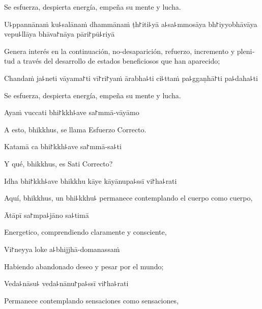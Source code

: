 \begin{english}
	Se esfuerza, despierta energía, empeña su mente y lucha.
\end{english}

\ifaivedition
\clearpage
\fi

U꜕ppannānaṁ ku꜕salānaṁ dhammānaṁ ṭh꜓iti꜕yā a꜕sa꜕mmosāya bh꜓iyyobhāvāya vepu꜕llāya bhāva꜓nāya pāri꜓pū꜕riyā

\begin{english}
	Genera interés en la continuación, no-desaparición, refuerzo, incremento y plenitud a través del desarrollo de estados beneficiosos que han aparecido;
\end{english}

Chandaṁ ja꜕neti vāyama꜓ti vī꜓ri꜓yaṁ ārabha꜕ti ci꜕ttaṁ pa꜕ggaṇhā꜓ti pa꜕daha꜕ti

\begin{english}
	Se esfuerza, despierta energía, empeña su mente y lucha.
\end{english}

Ayaṁ vuccati bhi꜓kkh꜕ave sa꜓mmā-vāyāmo

\begin{english}
	A esto, bhikkhus, se llama Esfuerzo Correcto.
\end{english}

Katamā ca bhi꜓kkh꜕ave sa꜓mmā-sa꜕ti

\begin{english}
	Y qué, bhikkhus, es Sati Correcto?
\end{english}

Idha bhi꜓kkh꜕ave bhikkhu kāye kāyānupa꜕ssī vi꜓ha꜕rati

\begin{english}
	Aquí, bhikkhus, un bhi꜕kkhu꜕ permanece contemplando el cuerpo como cuerpo,
\end{english}

Ātāpī sa꜓mpa꜕jāno sa꜕timā

\begin{english}
	Energetico, comprendiendo claramente y consciente,
\end{english}

Vi꜓neyya loke a꜕bhijjhā-domanassaṁ

\begin{english}
	Habiendo abandonado deseo y pesar por el mundo;
\end{english}

Veda꜕nāsu꜕ veda꜕nānu꜓pa꜕ssī vi꜓ha꜕rati

\begin{english}
	Permanece contemplando sensaciones como sensaciones,
\end{english}

